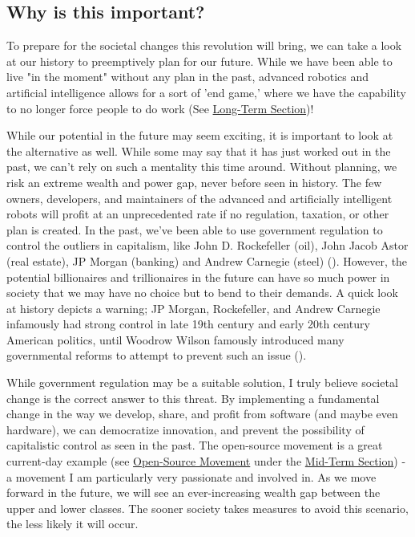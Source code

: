 \subsection{Why is this important?}

To prepare for the societal changes this revolution will bring, we can take a look at our history to preemptively plan for our future. While we have been able to live "in the moment" without any plan in the past, advanced robotics and artificial intelligence allows for a sort of 'end game,' where we have the capability to no longer force people to do work (See \hyperref[sec:long]{Long-Term Section})!

While our potential in the future may seem exciting, it is important to look at the alternative as well. While some may say that it has just worked out in the past, we can't rely on such a mentality this time around. Without planning, we risk an extreme wealth and power gap, never before seen in history. The few owners, developers, and maintainers of the advanced and artificially intelligent robots will profit at an unprecedented rate if no regulation, taxation, or other plan is created. In the past, we've been able to use government regulation to control the outliers in capitalism, like John D. Rockefeller (oil), John Jacob Astor (real estate), JP Morgan (banking) and Andrew Carnegie (steel) (\cite{CapitalistAmerica}). However, the potential billionaires and trillionaires in the future can have so much power in society that we may have no choice but to bend to their demands. A quick look at history depicts a warning; JP Morgan, Rockefeller, and Andrew Carnegie infamously had strong control in late 19th century and early 20th century American politics, until Woodrow Wilson famously introduced many governmental reforms to attempt to prevent such an issue (\cite{CapitalismSocialismDemocracy}).

While government regulation may be a suitable solution, I truly believe societal change is the correct answer to this threat. By implementing a fundamental change in the way we develop, share, and profit from software (and maybe even hardware), we can democratize innovation, and prevent the possibility of capitalistic control as seen in the past. The open-source movement is a great current-day example (see \hyperref[subsec:open-source]{Open-Source Movement} under the \hyperref[sec:mid]{Mid-Term Section}) - a movement I am particularly very passionate and involved in. As we move forward in the future, we will see an ever-increasing wealth gap between the upper and lower classes. The sooner society takes measures to avoid this scenario, the less likely it will occur.

